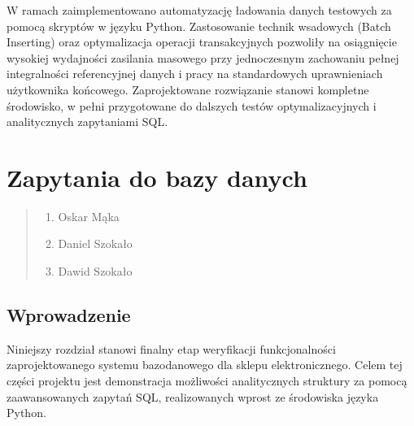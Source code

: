 \documentclass[letterpaper,10pt,polish]{sphinxmanual}
\begin{document}
\sphinxAtStartPar
W ramach  zaimplementowano automatyzację ładowania danych testowych za pomocą skryptów w języku Python. Zastosowanie technik wsadowych (Batch Inserting) oraz optymalizacja operacji transakcyjnych pozwoliły na osiągnięcie wysokiej wydajności zasilania masowego przy jednoczesnym zachowaniu pełnej integralności referencyjnej danych i pracy na standardowych uprawnieniach użytkownika końcowego. Zaprojektowane rozwiązanie stanowi kompletne środowisko, w pełni przygotowane do dalszych testów optymalizacyjnych i analitycznych zapytaniami SQL.

\sphinxstepscope

\sphinxstepscope


\chapter{Zapytania do bazy danych}
\label{\detokenize{rozdzia_u0142_5/BD_Zapytania/index:zapytania-do-bazy-danych}}\label{\detokenize{rozdzia_u0142_5/BD_Zapytania/index::doc}}\label{\detokenize{rozdzia_u0142_5/BD_Zapytania/index::doc}}\begin{quote}\begin{description}
\begin{enumerate}
%
\item {} 
\sphinxAtStartPar
Oskar Mąka

\item {} 
\sphinxAtStartPar
Daniel Szokało

\item {} 
\sphinxAtStartPar
Dawid Szokało

\end{enumerate}

\end{description}\end{quote}


\section{Wprowadzenie}
\label{\detokenize{rozdzia_u0142_5/BD_Zapytania/index:wprowadzenie}}
\sphinxAtStartPar
Niniejszy rozdział stanowi finalny etap weryfikacji funkcjonalności zaprojektowanego systemu bazodanowego dla sklepu elektronicznego. Celem tej części projektu jest demonstracja możliwości analitycznych struktury za pomocą zaawansowanych zapytań SQL, realizowanych wprost ze środowiska języka Python.
\end{document}

